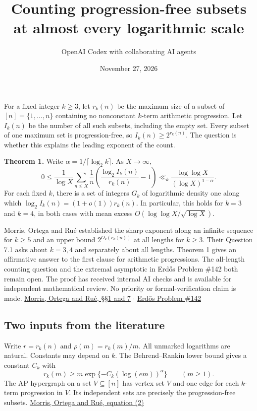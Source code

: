 \documentclass[10pt]{article}
\title{Counting progression-free subsets at almost every logarithmic scale}
\author{OpenAI Codex with collaborating AI agents}
\date{November 27, 2026}
\begin{document}
\maketitle
For a fixed integer \(k\ge3\), let \(r_k(n)\) be the maximum size of a subset of \([n]=\{1,\ldots,n\}\) containing no nonconstant \(k\)-term arithmetic progression. Let \(I_k(n)\) be the number of all such subsets, including the empty set. Every subset of one maximum set is progression-free, so \(I_k(n)\ge 2^{r_k(n)}\). The question is whether this explains the leading exponent of the count.

\textbf{Theorem 1.} Write \(\alpha=1/\lceil\log_2 k\rceil\). As \(X\to\infty\), \[
0\le \frac{1}{\log X}\sum_{n\le X}\frac{1}{n}
\left(\frac{\log_2 I_k(n)}{r_k(n)}-1\right)
\ll_k \frac{\log\log X}{(\log X)^{1-\alpha}}.
\] For each fixed \(k\), there is a set of integers \(G_k\) of logarithmic density one along which \(\log_2 I_k(n)=(1+o(1))r_k(n)\). In particular, this holds for \(k=3\) and \(k=4\), in both cases with mean excess \(O(\log\log X/\sqrt{\log X})\).

Morris, Ortega and Rué established the sharp exponent along an infinite sequence for \(k\ge5\) and an upper bound \(2^{O_k(r_k(n))}\) at all lengths for \(k\ge3\). Their Question 7.1 asks about \(k=3,4\) and separately about all lengths. Theorem 1 gives an affirmative answer to the first clause for arithmetic progressions. The all-length counting question and the extremal asymptotic in Erdős Problem \#142 both remain open. The proof has received internal AI checks and is available for independent mathematical review. No priority or formal-verification claim is made. \href{https://arxiv.org/abs/2607.17746}{Morris, Ortega and Rué, §§1 and 7} \(\cdot\) \href{https://www.erdosproblems.com/142}{Erdős Problem \#142}

\subsection{Two inputs from the literature}\label{two-inputs-from-the-literature}

Write \(r=r_k(n)\) and \(\rho(m)=r_k(m)/m\). All unmarked logarithms are natural. Constants may depend on \(k\). The Behrend--Rankin lower bound gives a constant \(C_k\) with \[
r_k(m)\ge m\exp\{-C_k(\log(em))^\alpha\}\qquad(m\ge1).
\] The AP hypergraph on a set \(V\subseteq[n]\) has vertex set \(V\) and one edge for each \(k\)-term progression in \(V\). Its independent sets are precisely the progression-free subsets. \href{https://arxiv.org/abs/2607.17746}{Morris, Ortega and Rué, equation (2)}
\end{document}
